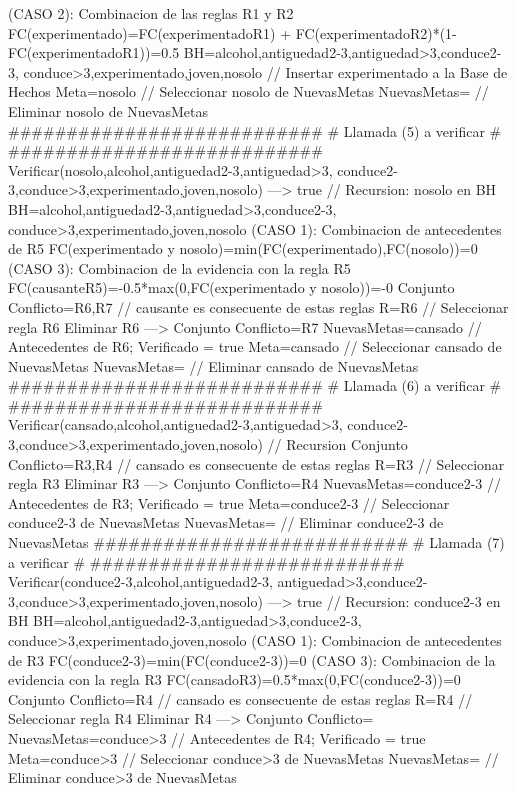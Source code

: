 \begin{listing}[language=Pascal]
	(CASO 2): Combinacion de las reglas R1 y R2
	 FC(experimentado)=FC(experimentado{R1}) + FC(experimentado{R2})*(1-FC(experimentado{R1}))=0.5
	BH={alcohol,antiguedad2-3,antiguedad>3,conduce2-3,
	conduce>3,experimentado,joven,nosolo} // Insertar experimentado a la Base de Hechos
	Meta=nosolo // Seleccionar nosolo de NuevasMetas
	NuevasMetas={} // Eliminar nosolo de NuevasMetas
  ###########################
  # Llamada (5) a verificar #
  ###########################
	Verificar(nosolo,{alcohol,antiguedad2-3,antiguedad>3,
	conduce2-3,conduce>3,experimentado,joven,nosolo}) ---> true // Recursion: nosolo en BH
	BH={alcohol,antiguedad2-3,antiguedad>3,conduce2-3,
	conduce>3,experimentado,joven,nosolo}
	(CASO 1): Combinacion de antecedentes de R5
	 FC(experimentado y nosolo)=min(FC(experimentado),FC(nosolo))=0
	(CASO 3): Combinacion de la evidencia con la regla R5
	 FC(causante{R5})=-0.5*max(0,FC(experimentado y nosolo))=-0
	Conjunto Conflicto={R6,R7} // causante es consecuente de estas reglas
	R={R6} // Seleccionar regla R6
	Eliminar R6 ---> Conjunto Conflicto={R7}
	NuevasMetas={cansado} // Antecedentes de R6; Verificado = true
	Meta=cansado // Seleccionar cansado de NuevasMetas
	NuevasMetas={} // Eliminar cansado de NuevasMetas
  ###########################
  # Llamada (6) a verificar #
  ###########################
	Verificar(cansado,{alcohol,antiguedad2-3,antiguedad>3,
	conduce2-3,conduce>3,experimentado,joven,nosolo})   // Recursion 
	Conjunto Conflicto={R3,R4} // cansado es consecuente de estas reglas
	R={R3} // Seleccionar regla R3
	Eliminar R3 ---> Conjunto Conflicto={R4}
	NuevasMetas={conduce2-3} // Antecedentes de R3; Verificado = true
	Meta=conduce2-3 // Seleccionar conduce2-3 de NuevasMetas
	NuevasMetas={} // Eliminar conduce2-3 de NuevasMetas
  ###########################
  # Llamada (7) a verificar #
  ###########################
	Verificar(conduce2-3,{alcohol,antiguedad2-3,
	antiguedad>3,conduce2-3,conduce>3,experimentado,joven,nosolo}) ---> true // Recursion: conduce2-3 en BH
	BH={alcohol,antiguedad2-3,antiguedad>3,conduce2-3,
	conduce>3,experimentado,joven,nosolo}
	(CASO 1): Combinacion de antecedentes de R3
	 FC(conduce2-3)=min(FC(conduce2-3))=0
	(CASO 3): Combinacion de la evidencia con la regla R3
	 FC(cansado{R3})=0.5*max(0,FC(conduce2-3))=0
	Conjunto Conflicto={R4} // cansado es consecuente de estas reglas
	R={R4} // Seleccionar regla R4
	Eliminar R4 ---> Conjunto Conflicto={}
	NuevasMetas={conduce>3} // Antecedentes de R4; Verificado = true
	Meta=conduce>3 // Seleccionar conduce>3 de NuevasMetas
	NuevasMetas={} // Eliminar conduce>3 de NuevasMetas

\end{listing}
